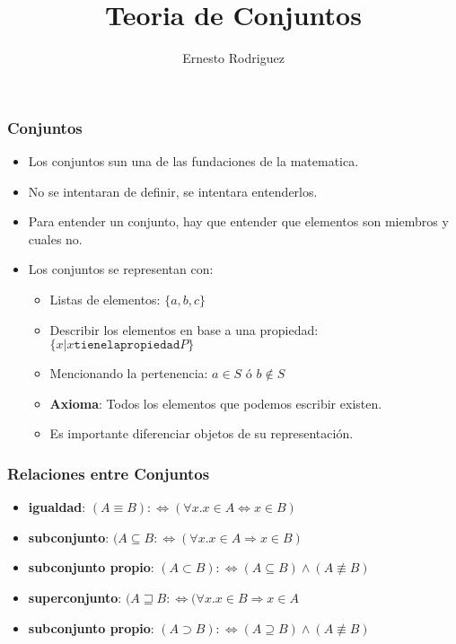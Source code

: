 \documentclass{beamer}
\title[Conjuntos]{Teoria de Conjuntos}
\author{Ernesto Rodriguez}
\institute{
    Universidad del Itsmo \\
    \medskip \textit{erodriguez@unis.edu.gt}
}
\date[\today]{}
\begin{document}
\begin{frame}
\frametitle{Conjuntos}
\begin{itemize}
\item{Los conjuntos sun una de las fundaciones de la matematica.}
\item{No se intentaran de definir, se intentara entenderlos.}
\item{Para entender un conjunto, hay que entender que elementos
son miembros y cuales no.}
\item{Los conjuntos se representan con:
\begin{itemize}
    \item{Listas de elementos: $\{a,b,c\}$}
    \item{Describir los elementos en base a una propiedad:
    $\{x|x \mathtt{tiene la propiedad} P\}$}
    \item{Mencionando la pertenencia: $a\in S$ \'o $b\notin S$}
    \item{{\bf Axioma}: Todos los elementos que podemos escribir
    existen.}
    \item{Es importante diferenciar objetos de su representaci\'on.}
\end{itemize}
}
\end{itemize}
\end{frame}

\begin{frame}
    \frametitle{Relaciones entre Conjuntos}
    \begin{itemize}
        \item{{\bf igualdad}: $(A\equiv B):\Leftrightarrow (
            \forall x.x\in A\Leftrightarrow x \in B)$}
        \item{{\bf subconjunto}: $(A\subseteq B:\Leftrightarrow
        (\forall x.x\in A\Rightarrow x\in B)$}
        \item{{\bf subconjunto propio}: $(A\subset B):\Leftrightarrow 
        (A\subseteq B)\wedge (A\not\equiv B)$}
        \item{{\bf superconjunto}: $(A\sqsupseteq B:\Leftrightarrow
        (\forall x.x\in B\Rightarrow x\in A$}
        \item{{\bf subconjunto propio}: $(A\supset B):\Leftrightarrow
        (A\supseteq B)\wedge(A\not\equiv B)$}
    \end{itemize}
\end{frame}
\end{document}

